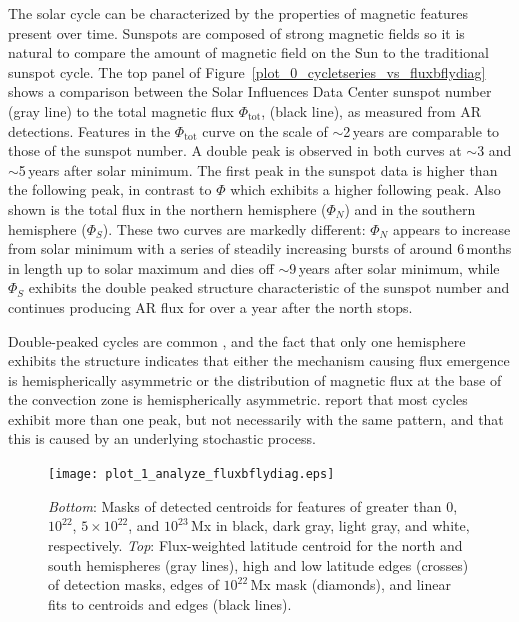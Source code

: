 The solar cycle can be characterized by the properties of magnetic features present over time. Sunspots are composed of strong magnetic fields so it is natural to compare the amount of magnetic field on the Sun to the traditional sunspot cycle. The top panel of Figure~\ref{plot_0_cycletseries_vs_fluxbflydiag} shows a comparison between the Solar Influences Data Center sunspot number (gray line) to the total magnetic flux $\Phi_{\mathrm{tot}}$, (black line), as measured from \gls{AR} detections. Features in the $\Phi_{\mathrm{tot}}$ curve on the scale of $\sim$2\,years are comparable to those of the sunspot number. A double peak is observed in both curves at $\sim$3 and $\sim$5\,years after solar minimum. The first peak in the sunspot data is higher than the following peak, in contrast to $\Phi$ which exhibits a higher following peak. Also shown is the total flux in the northern hemisphere ($\Phi_N$) and in the southern hemisphere ($\Phi_S$). These two curves are markedly different: $\Phi_N$ appears to increase from solar minimum with a series of steadily increasing bursts of around 6\,months in length up to solar maximum and dies off $\sim$9\,years after solar minimum, while $\Phi_S$ exhibits the double peaked structure characteristic of the sunspot number and continues producing \gls{AR} flux for over a year after the north stops. 

Double-peaked cycles are common \citep{gnevyshev:1977}, and the fact that only one hemisphere exhibits the structure indicates that either the mechanism causing flux emergence is hemispherically asymmetric or the distribution of magnetic flux at the base of the convection zone is hemispherically asymmetric. 
\citet{wang:2003a} report that most cycles exhibit more than one peak, but not necessarily with the same pattern, and that this is caused by an underlying stochastic process.


\begin{figure}[!t]
\centerline{\texttt{[image: plot\_1\_analyze\_fluxbflydiag.eps]}}
\caption[A butterfly map indicating magnetic flux emergence.]{\emph{Bottom}: Masks of detected centroids for features of greater than $0$, $10^{22}$, $5\times10^{22}$, and $10^{23}$\,Mx in black, dark gray, light gray, and white, respectively. \emph{Top}: Flux-weighted latitude centroid for the north and south hemispheres (gray lines), high and low latitude edges (crosses) of detection masks, edges of $10^{22}$\,Mx mask (diamonds), and linear fits to centroids and edges (black lines).}
\label{plot_1_analyze_fluxbflydiag}
\end{figure}

